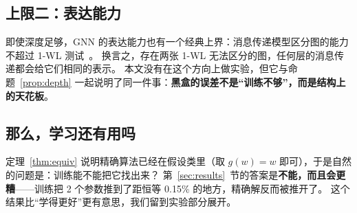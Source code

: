 \subsection{上限二：表达能力}

即使深度足够，GNN 的表达能力也有一个经典上界：消息传递模型区分图的能力不超过 1-WL 测试~\cite{xu2019gin}。
换言之，存在两张 1-WL 无法区分的图，任何层的消息传递都会给它们相同的表示。
本文没有在这个方向上做实验，但它与命题~\ref{prop:depth} 一起说明了同一件事：\textbf{黑盒的误差不是“训练不够”，而是结构上的天花板}。

\subsection{那么，学习还有用吗}

定理~\ref{thm:equiv} 说明精确算法已经在假设类里（取 $g(w)=w$ 即可），于是自然的问题是：训练能不能把它找出来？
第~\ref{sec:results}~节的答案是\textbf{不能，而且会更糟}——训练把 2 个参数推到了距恒等 0.15\% 的地方，精确解反而被推开了。
这个结果比“学得更好”更有意思，我们留到实验部分展开。
